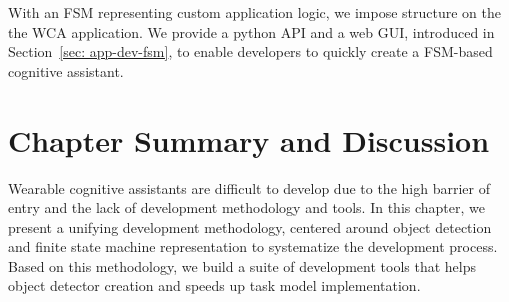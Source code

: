 With an FSM representing custom application logic, we impose structure on the
the WCA application. We provide a python API and a web GUI, introduced in
Section~\ref{sec: app-dev-fsm}, to enable developers to quickly create a
FSM-based cognitive assistant. 




\section{Chapter Summary and Discussion}

Wearable cognitive assistants are difficult to develop due to the high barrier of
entry and the lack of development methodology and tools. In this chapter, we
present a unifying development methodology, centered around object detection and
finite state machine representation to systematize the development process.
Based on this methodology, we build a suite of development tools that helps
object detector creation and speeds up task model implementation. 

